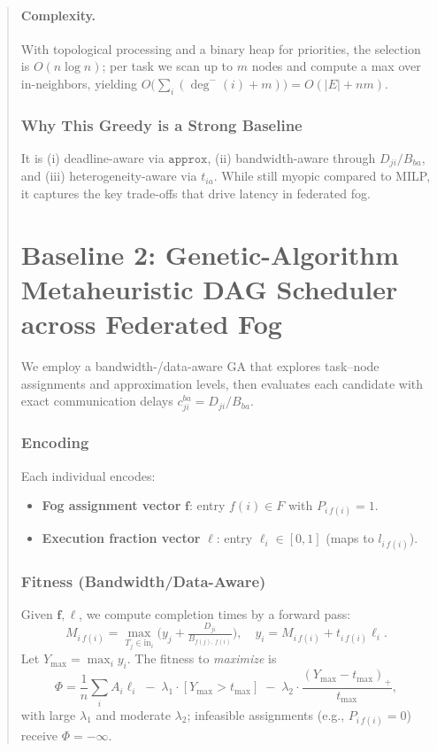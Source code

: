 \documentclass[conference]{IEEEtran}
\begin{document}
\begin{abstract}
\paragraph{Complexity.} With topological processing and a binary heap for priorities, the selection is \(O(n\log n)\); per task we scan up to \(m\) nodes and compute a max over in-neighbors, yielding \(O\!\big(\sum_i (\deg^-(i)+m)\big)=O(|E|+nm)\).

\subsubsection{Why This Greedy is a Strong Baseline}
It is (i) deadline-aware via \(\texttt{approx}\), (ii) bandwidth-aware through \(D_{ji}/B_{ba}\), and (iii) heterogeneity-aware via \(t_{ia}\). While still myopic compared to MILP, it captures the key trade-offs that drive latency in federated fog.

\section{Baseline 2: Genetic-Algorithm Metaheuristic DAG Scheduler across Federated Fog}
\label{sec:baseline-ga}
We employ a bandwidth-/data-aware GA that explores task--node assignments and approximation levels, then evaluates each candidate with exact communication delays \(c_{ji}^{ba}=D_{ji}/B_{ba}\).

\subsubsection{Encoding}
Each individual encodes:
\begin{itemize}
    \item \textbf{Fog assignment vector} \(\mathbf{f}\): entry \(f(i)\in F\) with \(P_{i\,f(i)}=1\).
    \item \textbf{Execution fraction vector} \(\boldsymbol{\ell}\): entry \(\ell_i\in[0,1]\) (maps to \(l_{i\,f(i)}\)).
\end{itemize}

\subsubsection{Fitness (Bandwidth/Data-Aware)}
Given \(\mathbf{f},\boldsymbol{\ell}\), we compute completion times by a forward pass:
\[
M_{i\,f(i)}=\max_{T_j\in \text{in}_i}\!\Big(y_j+\tfrac{D_{ji}}{B_{f(j),\,f(i)}}\Big),\quad
y_i=M_{i\,f(i)}+t_{i\,f(i)}\ell_i.
\]
Let \(Y_{\max}=\max_i y_i\). The fitness to \emph{maximize} is
\[
\Phi=\frac{1}{n}\sum_i A_i \ell_i\;-\;\lambda_1\!\cdot\![Y_{\max}>t_{\max}]\;-\;\lambda_2\!\cdot\!\frac{(Y_{\max}-t_{\max})_+}{t_{\max}},
\]
with large \(\lambda_1\) and moderate \(\lambda_2\); infeasible assignments (e.g., \(P_{i\,f(i)}=0\)) receive \(\Phi=-\infty\).


\end{abstract}
\end{document}
